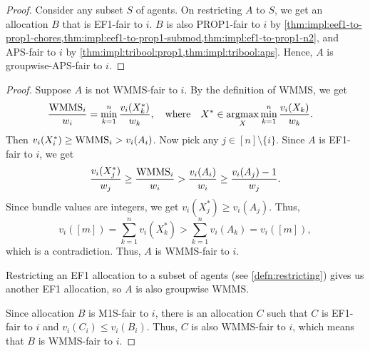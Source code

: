 \begin{proof}
Consider any subset $S$ of agents.
On restricting $A$ to $S$, we get an allocation $B$ that is EF1-fair to $i$.
$B$ is also PROP1-fair to $i$ by \cref{thm:impl:eef1-to-prop1-chores,thm:impl:eef1-to-prop1-submod,thm:impl:ef1-to-prop1-n2},
and APS-fair to $i$ by \cref{thm:impl:tribool:prop1,thm:impl:tribool:aps}.
Hence, $A$ is groupwise-APS-fair to $i$.
\end{proof}

\begin{proof}
Suppose $A$ is not WMMS-fair to $i$. By the definition of WMMS, we get
\begin{align*}
& \frac{\mathrm{WMMS}_i}{w_i} = \min_{k=1}^n \frac{v_i(X^*_k)}{w_k},
\relax\quad\text{where}\quad X^* \in \operatorname*{argmax}_X \min_{k=1}^n \frac{v_i(X_k)}{w_k}.
\end{align*}
Then $v_i(X^*_i) \ge \mathrm{WMMS}_i > v_i(A_i)$.
%
Now pick any $j \in [n] \setminus \{i\}$. Since $A$ is EF1-fair to $i$, we get
\[ \frac{v_i(X^*_j)}{w_j} \ge \frac{\mathrm{WMMS}_i}{w_i} > \frac{v_i(A_i)}{w_i} \ge \frac{v_i(A_j)-1}{w_j}. \]
Since bundle values are integers, we get $v_i(X^*_j) \ge v_i(A_j)$. Thus,
\[ v_i([m]) = \sum_{k=1}^n v_i(X^*_k) > \sum_{k=1}^n v_i(A_k) = v_i([m]), \]
which is a contradiction. Thus, $A$ is WMMS-fair to $i$.

Restricting an EF1 allocation to a subset of agents (see \cref{defn:restricting})
gives us another EF1 allocation, so $A$ is also groupwise WMMS.

Since allocation $B$ is M1S-fair to $i$, there is an allocation $C$ such that
$C$ is EF1-fair to $i$ and $v_i(C_i) \le v_i(B_i)$.
Thus, $C$ is also WMMS-fair to $i$, which means that $B$ is WMMS-fair to $i$.
\end{proof}

